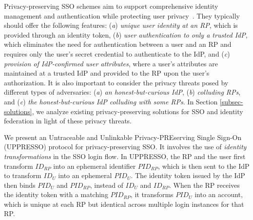 Privacy-preserving SSO schemes aim to support comprehensive identity management and authentication while protecting user privacy~\cite{maler2008venn, NIST2017draft, BrowserID, SPRESSO}.
They typically should offer the following features:
(\emph{a}) \emph{unique user identity at an RP}, which is provided through an identity token,
(\emph{b}) \emph{user authentication to only a trusted IdP}, which eliminates the need for authentication between a user and an RP and requires only the user's secret credential to authenticate to the IdP,
and (\emph{c}) \emph{provision of IdP-confirmed user attributes},  where a user's attributes are maintained at a trusted IdP and provided to the RP upon the user's authorization. 
It is also important to consider the privacy threats posed by different types of adversaries: 
(\emph{a}) \emph{an honest-but-curious IdP}, 
(\emph{b}) \emph{colluding RPs}, 
and (\emph{c}) \emph{the honest-but-curious IdP colluding with some RPs}.
In Section \ref{subsec-solutions}, we analyze existing privacy-preserving solutions for SSO and identity federation in light of these privacy threats.


We present an Untraceable and Unlinkable Privacy-PREserving Single Sign-On (UPPRESSO) protocol for privacy-preserving SSO. It involves the use of {\em identity transformations} in the SSO login flow. %
In UPPRESSO, the RP and the user first transform $ID_{RP}$ into an ephemeral identifier $PID_{RP}$, which is then sent to the IdP to transform $ID_U$ into an ephemeral $PID_U$. The identity token issued by the IdP then binds $PID_U$ and $PID_{RP}$, instead of $ID_U$ and $ID_{RP}$. When the RP receives the identity token with a matching $PID_{RP}$, it transforms $PID_U$ into an account, which is unique at each RP but identical across multiple login instances for that RP.


